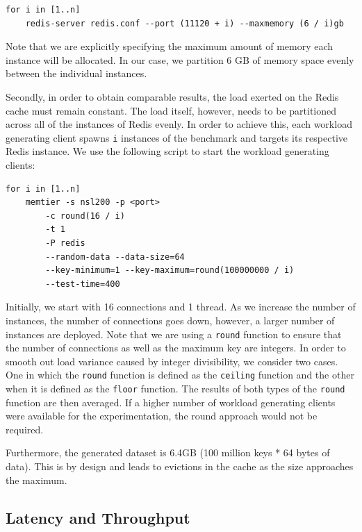 \begin{lstlisting}
for i in [1..n]
    redis-server redis.conf --port (11120 + i) --maxmemory (6 / i)gb
\end{lstlisting}

Note that we are explicitly specifying the maximum amount of memory each instance will be allocated. In our case, we partition 6 GB of memory space evenly between the individual instances.

Secondly, in order to obtain comparable results, the load exerted on the Redis cache must remain constant. The load itself, however, needs to be partitioned across all of the instances of Redis evenly. In order to achieve this, each workload generating client spawns \texttt{i} instances of the benchmark and targets its respective Redis instance. We use the following script to start the workload generating clients:

\begin{lstlisting}
for i in [1..n]
    memtier -s nsl200 -p <port>
        -c round(16 / i)
        -t 1
        -P redis
        --random-data --data-size=64
        --key-minimum=1 --key-maximum=round(100000000 / i)
        --test-time=400
\end{lstlisting}

Initially, we start with 16 connections and 1 thread. As we increase the number of instances, the number of connections goes down, however, a larger number of instances are deployed. Note that we are using a \texttt{round} function to ensure that the number of connections as well as the maximum key are integers. In order to smooth out load variance caused by integer divisibility, we consider two cases. One in which the \texttt{round} function is defined as the \texttt{ceiling} function and the other when it is defined as the \texttt{floor} function. The results of both types of the \texttt{round} function are then averaged. If a higher number of workload generating clients were available for the experimentation, the round approach would not be required.

Furthermore, the generated dataset is 6.4GB (100 million keys * 64 bytes of data). This is by design and leads to evictions in the cache as the size approaches the maximum.


\subsection{Latency and Throughput}

